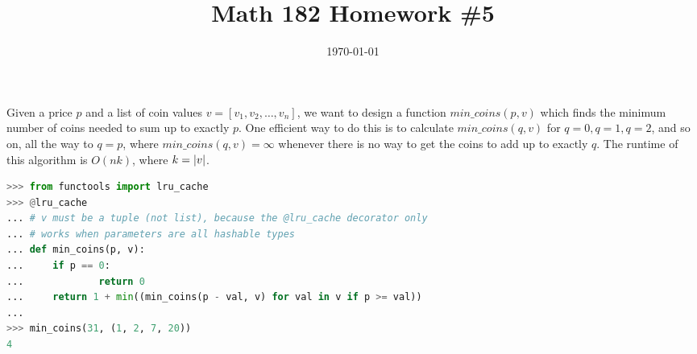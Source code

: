 \documentclass{article}
\date{\today}
\title{Math 182 Homework \#5}
\begin{document}
\maketitle

\begin{prob}
\end{prob}
Given a price $p$ and a list of coin values $v = [v_1, v_2, \dots, v_n]$, we want to design a function $min\_coins(p, v)$ which finds the minimum number of coins needed to sum up to exactly $p$. One efficient way to do this is to calculate $min\_coins(q, v)$ for $q=0, q=1, q=2$, and so on, all the way to $q=p$, where $min\_coins(q, v) = \infty$ whenever there is no way to get the coins to add up to exactly $q$. The runtime of this algorithm is $O(nk)$, where $k=\left\lvert v \right\rvert$.

\begin{lstlisting}[language=Python, frame=single]
>>> from functools import lru_cache
>>> @lru_cache
... # v must be a tuple (not list), because the @lru_cache decorator only
... # works when parameters are all hashable types
... def min_coins(p, v):
...     if p == 0:
...             return 0
...     return 1 + min((min_coins(p - val, v) for val in v if p >= val))
... 
>>> min_coins(31, (1, 2, 7, 20))
4
\end{lstlisting}


\end{document}

